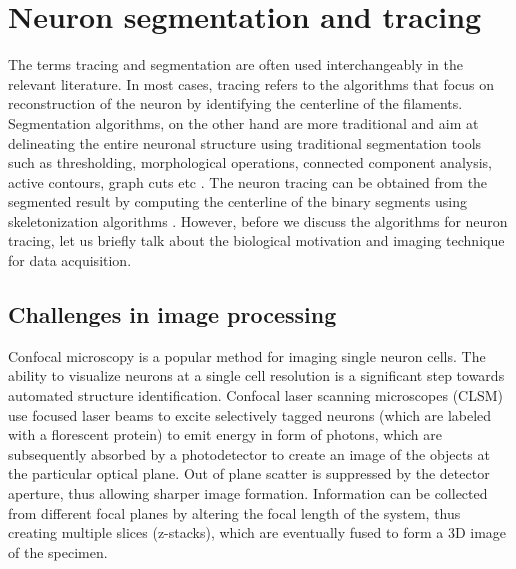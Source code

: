 \section{Neuron segmentation and tracing}

The terms tracing and segmentation are often used interchangeably in the relevant literature. In most cases, tracing refers to the algorithms that focus on reconstruction of the neuron by identifying the centerline of the filaments. Segmentation algorithms, on the other hand are more traditional and aim at delineating the entire neuronal structure using traditional segmentation tools such as thresholding, morphological operations, connected component analysis, active contours, graph cuts etc \cite{bovik2010handbook}. The neuron tracing can be obtained from the segmented result by computing the centerline of the binary segments using skeletonization algorithms \cite{bovik2010handbook}.  However, before we discuss the algorithms for neuron tracing, let us briefly talk about the biological motivation and imaging technique for data acquisition.

\subsection{Challenges in image processing}

Confocal microscopy is a popular method for imaging single neuron cells. The ability to visualize neurons at a single cell resolution is a significant step towards automated structure identification.  Confocal laser scanning microscopes (CLSM) use focused laser beams to excite selectively tagged neurons (which are labeled with a florescent protein) to emit energy in form of photons, which are subsequently absorbed by a photodetector to create an image of the objects at the particular optical plane. Out of plane scatter is suppressed by the detector aperture, thus allowing sharper image formation.  Information can be collected  from different focal planes by altering the focal length of the system, thus creating multiple slices (z-stacks), which are eventually fused to form a 3D image of the specimen. 


